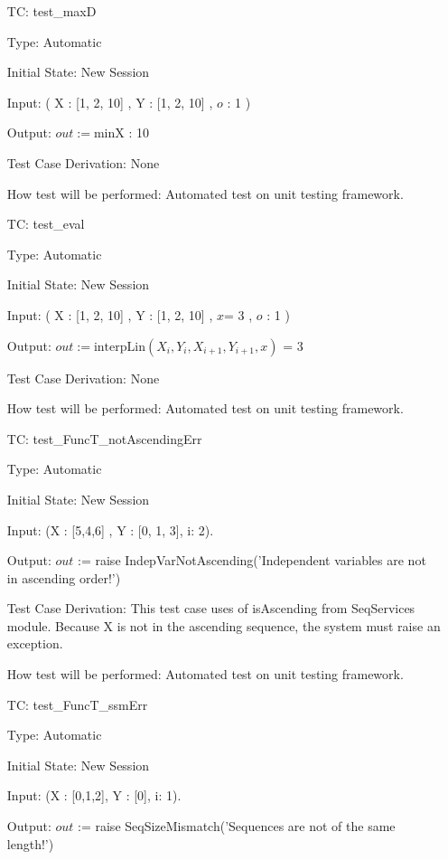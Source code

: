 \documentclass[12pt]{article}
\newcounter{utestnum} %
\begin{document}
\begin{enumerate}[label=TC\arabic*:,ref={\arabic*}]
\item [TC\refstepcounter{utestnum}\theutestnum: \label{FuncTmaxDTest}] 
test\_maxD

Type: Automatic

Initial State: New Session

Input: ( X : [1, 2, 10] , Y : [1, 2, 10] , $o$ : 1 )

Output: $out := \mbox{minX}$ : 10


Test Case Derivation: None

How test will be performed: Automated test on unit testing framework.

\item [TC\refstepcounter{utestnum}\theutestnum: \label{FuncTevalDTest}] 
test\_eval

Type: Automatic

Initial State: New Session

Input: ( X : [1, 2, 10] , Y : [1, 2, 10] , $x$= 3 ,  $o$ : 1 )

Output: $out := \mbox{interpLin}(X_i, Y_i, X_{i+1}, Y_{i+1}, x)$ = 3


Test Case Derivation: None

How test will be performed: Automated test on unit testing framework.


\item [TC\refstepcounter{utestnum}\theutestnum: \label{FuncTnotAscendingErrTest}] 
test\_FuncT\_notAscendingErr

Type: Automatic

Initial State: New Session

Input: (X : [5,4,6] , Y : [0, 1, 3], i: 2).

Output: $out$ := raise IndepVarNotAscending('Independent variables are not in ascending order!')


Test Case Derivation: This test case uses of isAscending from SeqServices module. Because X is not in the ascending sequence, the system must raise an exception. 

How test will be performed: Automated test on unit testing framework.

\item [TC\refstepcounter{utestnum}\theutestnum: \label{FuncTssmErrTest}] 
test\_FuncT\_ssmErr

Type: Automatic

Initial State: New Session

Input: (X : [0,1,2], Y : [0], i: 1).

Output: $out$ := raise SeqSizeMismatch('Sequences are not of the same length!')



\end{enumerate}
\end{document}

